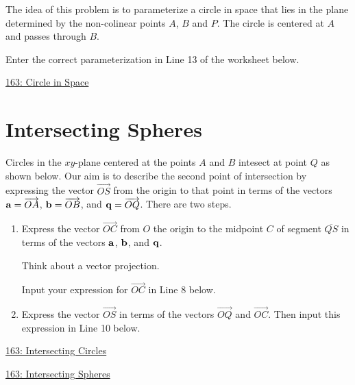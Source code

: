 \documentclass{ximera}
\begin{document}
\begin{question}  \label{Q9df43r23rfddfs}
The idea of this problem is to parameterize a circle in space that lies in the plane determined by the non-colinear points $A$, $B$ and $P$. The circle is centered at $A$ and passes through $B$.

Enter the correct parameterization in Line 13 of the worksheet below.


\begin{onlineOnly}
    \begin{center}
\end{center}
\end{onlineOnly}

\href{https://www.desmos.com/3d/4qvuqtp4lo}{163: Circle in Space}

\end{question}




\section{Intersecting Spheres}

\begin{question} \label{Q:74dsfretg4444}
Circles in the $xy$-plane centered at the points $A$ and $B$ intesect at point $Q$ as shown below. Our aim is to describe the second point of intersection by expressing the vector $\overrightarrow{OS}$ from the origin to that point in terms of the vectors ${\bf a} = \overrightarrow{OA}$, ${\bf b} = \overrightarrow{OB}$, and ${\bf q} = \overrightarrow{OQ}$. There are two steps.

\begin{enumerate}
\item Express the vector $\overrightarrow{OC}$ from $O$ the origin to the midpoint $C$ of segment $\overline{QS}$ in terms of the vectors ${\bf a}$, ${\bf b}$, and ${\bf q}$.
\begin{hint}
Think about a vector projection.
\end{hint}
Input your expression for $\overrightarrow{OC}$ in Line 8 below.


\item Express the vector $\overrightarrow{OS}$ in terms of the vectors $\overrightarrow{OQ}$ and $\overrightarrow{OC}$. Then input this expression in Line 10 below.

\end{enumerate}

\begin{onlineOnly}
    \begin{center}
\end{center}
\end{onlineOnly}

\href{https://www.desmos.com/3d/nttmyvnge7}{163: Intersecting Circles}
\end{question}



\begin{question} \label{Q:743rf4rtg4444}

\begin{onlineOnly}
    \begin{center}
\end{center}
\end{onlineOnly}

\href{https://www.desmos.com/3d/wftyxbvczm}{163: Intersecting Spheres}
\end{question}
\end{document}
